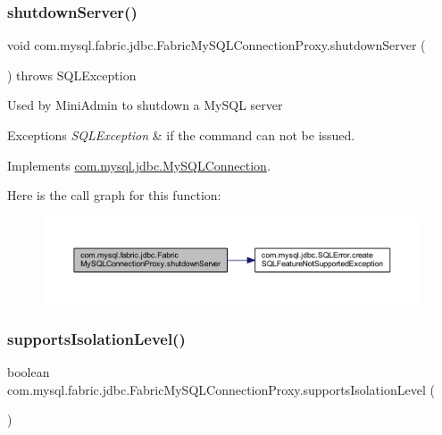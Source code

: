 \subsubsection{\texorpdfstring{shutdown\+Server()}{shutdownServer()}}
{\footnotesize\ttfamily void com.\+mysql.\+fabric.\+jdbc.\+Fabric\+My\+S\+Q\+L\+Connection\+Proxy.\+shutdown\+Server (\begin{DoxyParamCaption}{ }\end{DoxyParamCaption}) throws S\+Q\+L\+Exception}

Used by Mini\+Admin to shutdown a My\+S\+QL server


\begin{DoxyExceptions}{Exceptions}
{\em S\+Q\+L\+Exception} & if the command can not be issued. \\
\hline
\end{DoxyExceptions}


Implements \mbox{\hyperlink{interfacecom_1_1mysql_1_1jdbc_1_1_my_s_q_l_connection_ab6fa367972e51a54bc186f7856568098}{com.\+mysql.\+jdbc.\+My\+S\+Q\+L\+Connection}}.

Here is the call graph for this function\+:\nopagebreak
\begin{figure}[H]
\begin{center}
\leavevmode
\includegraphics[width=350pt]{classcom_1_1mysql_1_1fabric_1_1jdbc_1_1_fabric_my_s_q_l_connection_proxy_ac227e92bb718704cd526d8bc728303c7_cgraph}
\end{center}
\end{figure}
\mbox{\label{classcom_1_1mysql_1_1fabric_1_1jdbc_1_1_fabric_my_s_q_l_connection_proxy_a5f9c2ce827dc172a0dead6a76ba1d48a}} 
\subsubsection{\texorpdfstring{supports\+Isolation\+Level()}{supportsIsolationLevel()}}
{\footnotesize\ttfamily boolean com.\+mysql.\+fabric.\+jdbc.\+Fabric\+My\+S\+Q\+L\+Connection\+Proxy.\+supports\+Isolation\+Level (\begin{DoxyParamCaption}{ }\end{DoxyParamCaption})}

